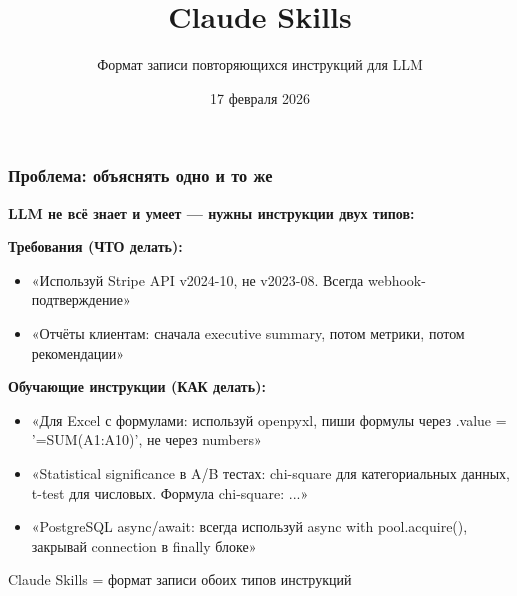 \documentclass[aspectratio=169]{beamer}
\title{Claude Skills}
\subtitle{Формат записи повторяющихся инструкций для LLM}
\date{17 февраля 2026}
\begin{document}
\frame{\titlepage}


\begin{frame}
\frametitle{Проблема: объяснять одно и то же}

\textbf{LLM не всё знает и умеет — нужны инструкции двух типов:}

\vspace{0.3cm}

\textbf{Требования (ЧТО делать):}
\begin{itemize}
    \item «Используй Stripe API v2024-10, не v2023-08. Всегда webhook-подтверждение»
    \item «Отчёты клиентам: сначала executive summary, потом метрики, потом рекомендации»
\end{itemize}

\vspace{0.3cm}

\textbf{Обучающие инструкции (КАК делать):}
\begin{itemize}
    \item «Для Excel с формулами: используй openpyxl, пиши формулы через .value = '=SUM(A1:A10)', не через numbers»
    \item «Statistical significance в A/B тестах: chi-square для категориальных данных, t-test для числовых. Формула chi-square: ...»
    \item «PostgreSQL async/await: всегда используй async with pool.acquire(), закрывай connection в finally блоке»
\end{itemize}

\vspace{0.3cm}

\begin{block}{Claude Skills = формат записи обоих типов инструкций}
\end{block}

\end{frame}

\end{document}
